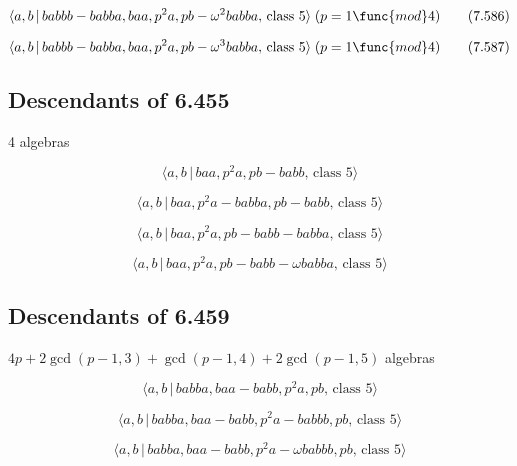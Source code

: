 \documentclass[10pt]{article}
\begin{document}
\begin{equation}
\langle a,b\,|\,babbb-babba,baa,p^{2}a,pb-\omega ^{2}babba,\,\text{class }%
5\rangle \;(p=1\func{mod}4)  \tag{7.586}
\end{equation}

\begin{equation}
\langle a,b\,|\,babbb-babba,baa,p^{2}a,pb-\omega ^{3}babba,\,\text{class }%
5\rangle \;(p=1\func{mod}4)  \tag{7.587}
\end{equation}

\subsection{Descendants of 6.455}

4 algebras

\begin{equation}
\langle a,b\,|\,baa,p^2a,pb-babb,\,\text{class }5\rangle  \tag{7.588}
\end{equation}

\begin{equation}
\langle a,b\,|\,baa,p^2a-babba,pb-babb,\,\text{class }5\rangle  \tag{7.589}
\end{equation}

\begin{equation}
\langle a,b\,|\,baa,p^2a,pb-babb-babba,\,\text{class }5\rangle  \tag{7.590}
\end{equation}

\begin{equation}
\langle a,b\,|\,baa,p^{2}a,pb-babb-\omega babba,\,\text{class }5\rangle 
\tag{7.591}
\end{equation}

\subsection{Descendants of 6.459}

$4p+2\gcd (p-1,3)+\gcd (p-1,4)+2\gcd (p-1,5)$ algebras

\begin{equation}
\langle a,b\,|\,babba,baa-babb,p^2a,pb,\,\text{class }5\rangle  \tag{7.592}
\end{equation}

\begin{equation}
\langle a,b\,|\,babba,baa-babb,p^2a-babbb,pb,\,\text{class }5\rangle 
\tag{7.593}
\end{equation}

\begin{equation}
\langle a,b\,|\,babba,baa-babb,p^{2}a-\omega babbb,pb,\,\text{class }5\rangle
\tag{7.594}
\end{equation}
\end{document}
